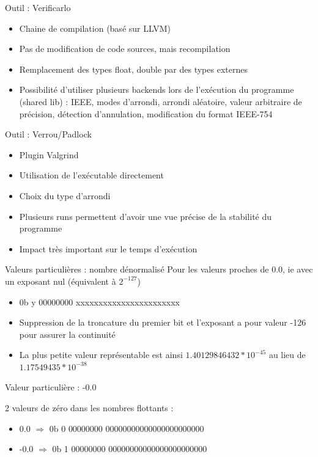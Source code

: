 \documentclass{beamer}
\begin{document}
  
      \begin{frame}{Outil : Verificarlo}
\begin{itemize}
\item Chaine de compilation (basé sur LLVM)
\item Pas de modification de code sources, mais recompilation
\item Remplacement des types float, double par des types externes
\item Possibilité d'utiliser plusieurs backends lors de l'exécution du programme (shared lib) : IEEE, modes d'arrondi, arrondi aléatoire, valeur arbitraire de précision, détection d'annulation, modification du format IEEE-754
\end{itemize}
  \end{frame}
    
      
    \begin{frame}{Outil : Verrou/Padlock}
\begin{itemize}
\item Plugin Valgrind
\item Utilisation de l'exécutable directement
\item Choix du type d'arrondi
\item Plusieurs runs permettent d'avoir une vue précise de la stabilité du programme
\item Impact très important sur le temps d'exécution
\end{itemize}
  \end{frame}
    
  \begin{frame}{Valeurs particulières : nombre dénormalisé}
  Pour les valeurs proches de 0.0, ie avec un exposant nul (équivalent à $2^{-127}$)
  \begin{itemize}
  \item 0b \textcolor{SignColor}{y} \textcolor{ExponentColor}{00000000} \textcolor{FractionColor}{xxxxxxxxxxxxxxxxxxxxxxx}
  \item Suppression de la troncature du premier bit et l'exposant a pour valeur -126 pour assurer la continuité 
  \item La plus petite valeur représentable est ainsi $1.40129846432*10^{-45}$ au lieu de $1.17549435*10^{-38}$
  \end{itemize}

  \end{frame}

  \begin{frame}{Valeur particulière : -0.0}
    \begin{large}
  2 valeurs de zéro dans les nombres flottants :
  \begin{itemize}
  \item 0.0 $\Rightarrow$ 0b \textcolor{SignColor}{0} \textcolor{ExponentColor}{00000000} \textcolor{FractionColor}{00000000000000000000000} \\
  \item -0.0 $\Rightarrow$ 0b \textcolor{SignColor}{1} \textcolor{ExponentColor}{00000000} \textcolor{FractionColor}{00000000000000000000000}
  \end{itemize}
        \end{large}
  \end{frame}
\end{document}
